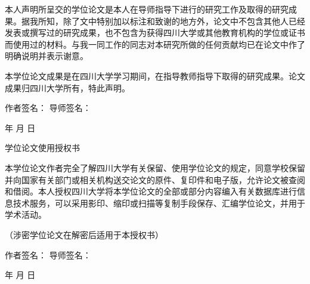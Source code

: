 
\songti {}
本人声明所呈交的学位论文是本人在导师指导下进行的研究工作及取得的研究成果。据我所知，除了文中特别加以标注和致谢的地方外，论文中不包含其他人已经发表或撰写过的研究成果，也不包含为获得四川大学或其他教育机构的学位或证书而使用过的材料。与我一同工作的同志对本研究所做的任何贡献均已在论文中作了明确说明并表示谢意。

本学位论文成果是在四川大学学习期间，在指导教师指导下取得的研究成果。论文成果归四川大学所有，特此声明。

\vspace{15pt}
\songti {} 作者签名：\hspace{4cm} \songti {} 导师签名：

\vspace{15pt}
\begin{flushright}
年\hspace{0.5cm} 月\hspace{0.5cm} 日
\end{flushright}

\vspace{140pt}

{}
\begin{center}
    \heiti {} 学位论文使用授权书
\end{center}

\songti {}
本学位论文作者完全了解四川大学有关保留、使用学位论文的规定，同意学校保留并向国家有关部门或相关机构送交论文的原件、复印件和电子版，允许论文被查阅和借阅。本人授权四川大学将本学位论文的全部或部分内容编入有关数据库进行信息技术服务，可以采用影印、缩印或扫描等复制手段保存、汇编学位论文，并用于学术活动。

（涉密学位论文在解密后适用于本授权书）

\vspace{15pt}
\songti {} 作者签名：\hspace{4cm} \songti {} 导师签名：

\vspace{15pt}
\begin{flushright}
年\hspace{0.5cm} 月\hspace{0.5cm} 日
\end{flushright}